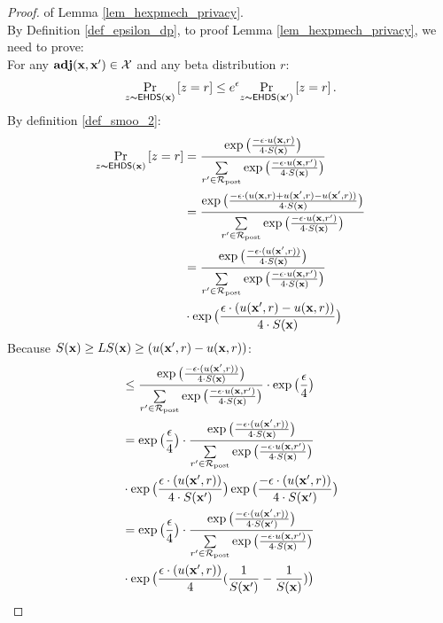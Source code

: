 \documentclass{article}
\begin{document}
\begin{proof} of Lemma \ref{lem_hexpmech_privacy}.\\
  By Definition \ref{def_epsilon_dp}, to proof Lemma \ref{lem_hexpmech_privacy}, we need to prove:\\
  For any $\textbf{adj}(\textbf{x},\textbf{x}') \in \mathcal{X}$ and any beta distribution $r$:
  \begin{equation*}
  \underset{z \thicksim \mathsf{EHDS}(\textbf{x})}{\Pr}\left[ z = r \right] \leq e^{\epsilon} \underset{z \thicksim \mathsf{EHDS}(\textbf{x}')}{\Pr}\left[ z = r \right]. 
  \end{equation*}
  By definition \ref{def_smoo_2}:
  \begin{equation*}
  \begin{split}
  \underset{z \thicksim \mathsf{EHDS}(\textbf{x})}{\Pr}\left[ z = r \right] 
  & = \frac {\exp\big(\frac{-\epsilon\cdot u(\textbf{x}, {r})}{4\cdot S(\textbf{x})}\big)}{\sum\limits_{r'\in \mathcal{R}_{\textup{post}}} \exp \big(\frac{-\epsilon\cdot u(\textbf{x}, r')}{4 \cdot S(\textbf{x})}\big)} \\
  & = \frac {\exp\big(
  \frac{-\epsilon\cdot(u(\textbf{x}, {r}) + u(\textbf{x}', {r}) - u(\textbf{x}', {r}))}{4\cdot S(\textbf{x})}
  \big)}
  {\sum\limits_{r'\in \mathcal{R}_{\textup{post}}} \exp \big(\frac{-\epsilon\cdot u(\textbf{x}, r')}{4 \cdot S(\textbf{x})}\big)} \\
  & = \frac {\exp\big(
  \frac{-\epsilon\cdot(u(\textbf{x}', {r}))}{4\cdot S(\textbf{x})}
  \big)}
  {\sum\limits_{r'\in \mathcal{R}_{\textup{post}}} \exp \big(\frac{-\epsilon\cdot u(\textbf{x}, r')}{4 \cdot S(\textbf{x})}\big)}
  \\
  & \cdot \exp\big( \frac{\epsilon\cdot(u(\textbf{x}', {r}) - u(\textbf{x}, {r}))}{4\cdot S(\textbf{x})} \big)\\
  \end{split}
  \end{equation*}
  Because $S(\textbf{x}) \geq LS(\textbf{x}) \geq (u(\textbf{x}', {r}) - u(\textbf{x}, {r}))$:
  \begin{equation*}
  \begin{split}
  & \leq \frac {\exp\big(
  \frac{-\epsilon\cdot(u(\textbf{x}', {r}))}{4\cdot S(\textbf{x})}
  \big)}
  {\sum\limits_{r'\in \mathcal{R}_{\textup{post}}} \exp \big(\frac{-\epsilon\cdot u(\textbf{x}, r')}{4 \cdot S(\textbf{x})}\big)}
  \cdot \exp\big( \frac{\epsilon}{4} \big) \\
  & = \exp\big( \frac{\epsilon}{4} \big) \cdot 
  \frac {
  \exp
  \big(
  \frac{-\epsilon\cdot(u(\textbf{x}', {r}))}{4\cdot S(\textbf{x})}
  \big)
  } 
  {\sum\limits_{r'\in \mathcal{R}_{\textup{post}}} \exp \big(\frac{-\epsilon\cdot u(\textbf{x}, r')}{4 \cdot S(\textbf{x})}\big)}\\
  & \cdot \exp
  \big(
  \frac{\epsilon\cdot(u(\textbf{x}', {r}))}{4\cdot S(\textbf{x}')}
  \big)
  \exp
  \big(
  \frac{-\epsilon\cdot(u(\textbf{x}', {r}))}{4\cdot S(\textbf{x}')}
  \big)\\
  & = \exp\big( \frac{\epsilon}{4} \big) \cdot 
  \frac {
  \exp
  \big(
  \frac{-\epsilon\cdot(u(\textbf{x}', {r}))}{4\cdot S(\textbf{x}')}
  \big)
  } 
  {\sum\limits_{r'\in \mathcal{R}_{\textup{post}}} \exp \big(\frac{-\epsilon\cdot u(\textbf{x}, r')}{4 \cdot S(\textbf{x})}\big)}\\
  & \cdot \exp
  \big(
  \frac{\epsilon\cdot(u(\textbf{x}', {r}))}{4}(\frac{1}{S(\textbf{x}')} - \frac{1}{S(\textbf{x})})
  \big)\\
  \end{split}
  \end{equation*}
  

\end{proof}
\end{document}
